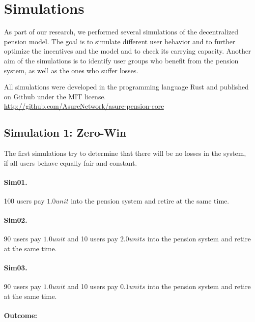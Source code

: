 \section{Simulations}

As part of our research, we performed several simulations of the decentralized pension model. The goal is to simulate different user behavior and to further optimize the incentives and the model and to check its carrying capacity. Another aim of the simulations is to identify user groups who benefit from the pension system, as well as the ones who suffer losses.

All simulations were developed in the programming language Rust and published on Github under the MIT license.\\
\url{http://github.com/AsureNetwork/asure-pension-core}

\subsection{Simulation 1: Zero-Win}

The first simulations try to determine that there will be no losses in the system, if all users behave equally fair and constant.

\paragraph{Sim01.} 100 users pay $1.0 unit$ into the pension system and retire at the same time.

\paragraph{Sim02.} 90 users pay $1.0 unit$ and 10 users pay $2.0 units$ into the pension system and retire at the same time.

\paragraph{Sim03.} 90 users pay $1.0 unit$ and 10 users pay $0.1 units$ into the pension system and retire at the same time.

\paragraph{Outcome:}

\begin{table}[hbt!]
\centering
{}
\end{table}

